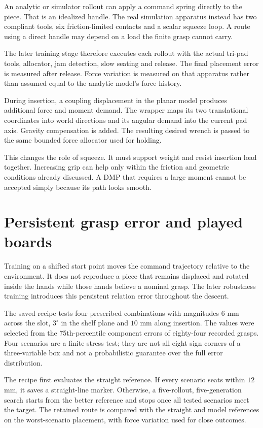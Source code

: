 An analytic or simulator rollout can apply a command spring directly to the piece. That is an idealized handle. The real simulation apparatus instead has two compliant tools, six friction-limited contacts and a scalar squeeze loop. A route using a direct handle may depend on a load the finite grasp cannot carry.

The later training stage therefore executes each rollout with the actual tri-pad tools, allocator, jam detection, slow seating and release. The final placement error is measured after release. Force variation is measured on that apparatus rather than assumed equal to the analytic model's force history.

During insertion, a coupling displacement in the planar model produces additional force and moment demand. The wrapper maps its two translational coordinates into world directions and its angular demand into the current pad axis. Gravity compensation is added. The resulting desired wrench is passed to the same bounded force allocator used for holding.

This changes the role of squeeze. It must support weight and resist insertion load together. Increasing grip can help only within the friction and geometric conditions already discussed. A DMP that requires a large moment cannot be accepted simply because its path looks smooth.

\section{Persistent grasp error and played boards}
\label{sec:persistent-grasp-error}

Training on a shifted start point moves the command trajectory relative to the environment. It does not reproduce a piece that remains displaced and rotated inside the hands while those hands believe a nominal grasp. The later robustness training introduces this persistent relation error throughout the descent.

The saved recipe tests four prescribed combinations with magnitudes $6$ mm across the slot, $3^\circ$ in the shelf plane and $10$ mm along insertion. The values were selected from the 75th-percentile component errors of eighty-four recorded grasps. Four scenarios are a finite stress test; they are not all eight sign corners of a three-variable box and not a probabilistic guarantee over the full error distribution.

The recipe first evaluates the straight reference. If every scenario seats within $12$ mm, it saves a straight-line marker. Otherwise, a five-rollout, five-generation search starts from the better reference and stops once all tested scenarios meet the target. The retained route is compared with the straight and model references on the worst-scenario placement, with force variation used for close outcomes.

